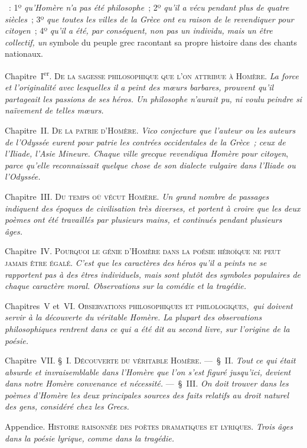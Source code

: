 \documentclass[french,twoside]{book} %
\newcommand\chaptercont{} %
\newcommand\chapterclose{} %
\begin{document}
\chaptercont
{} : 1º {\itshape qu’Homère n’a pas été philosophe} ; 2º {\itshape qu’il a vécu pendant plus de quatre siècles} ; 3º {\itshape que toutes les villes de la Grèce ont eu raison de le revendiquer pour citoyen} ; 4º {\itshape qu’il a été, par conséquent, non pas un individu, mais un être collectif, un} symbole du peuple grec racontant sa propre histoire dans des chants nationaux.\par
Chapitre I\textsuperscript{er}. {\scshape De la sagesse philosophique que l’on attribue à Homère.} {\itshape La force et l’originalité avec lesquelles il a peint des mœurs barbares, prouvent qu’il partageait les passions de ses héros. Un philosophe n’aurait pu, ni voulu peindre si naïvement de telles mœurs.}\par
Chapitre II. {\scshape De la patrie d’Homère.} {\itshape Vico conjecture que l’auteur ou les auteurs de l’Odyssée eurent pour patrie les contrées occidentales de la Grèce ; ceux de l’Iliade, l’Asie Mineure. Chaque ville grecque revendiqua Homère pour citoyen},  {\itshape parce qu’elle reconnaissait quelque chose de son dialecte vulgaire dans l’Iliade ou l’Odyssée.}\par
Chapitre III. {\scshape Du temps où vécut Homère.} {\itshape Un grand nombre de passages indiquent des époques de civilisation très diverses, et portent à croire que les deux poèmes ont été travaillés par plusieurs mains, et continués pendant plusieurs âges.}\par
Chapitre IV. {\scshape Pourquoi le génie d’Homère dans la poésie héroïque ne peut jamais être égalé.} {\itshape C’est que les caractères des héros qu’il a peints ne se rapportent pas à des êtres individuels, mais sont plutôt des symboles populaires de chaque caractère moral. Observations sur la comédie et la tragédie.}\par
Chapitres V et VI. {\scshape Observations philosophiques et philologiques}, {\itshape qui doivent servir à la découverte du véritable Homère. La plupart des observations philosophiques rentrent dans ce qui a été dit au second livre, sur l’origine de la poésie.}\par
Chapitre VII. § I. {\scshape Découverte du véritable Homère.} — § II. {\itshape Tout ce qui était absurde et invraisemblable dans l’Homère que l’on s’est figuré jusqu’ici, devient dans notre Homère convenance et nécessité.} — § III. {\itshape On doit trouver dans les poèmes d’Homère les deux principales sources des faits relatifs au droit naturel des gens, considéré chez les Grecs.}\par
Appendice. {\scshape Histoire raisonnée des poètes dramatiques et lyriques.} {\itshape Trois âges dans la poésie lyrique, comme dans la tragédie.}
\chapterclose
\end{document}
